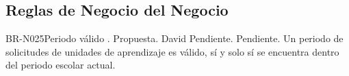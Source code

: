 


\subsection{Reglas de Negocio del Negocio}

\begin{BusinessRule}{BR-N025}{Periodo válido}
	{\bcCondition}    %
	{\btEnabler}     %
	{\blControlling}    %
	.
	\BRItem[Estado] Propuesta.
	 David
	 Pendiente.
	 Pendiente.
	\BRItem[Descripción] Un periodo de solicitudes de unidades de aprendizaje es válido, sí y solo sí se encuentra dentro del periodo escolar actual.
\end{BusinessRule}


